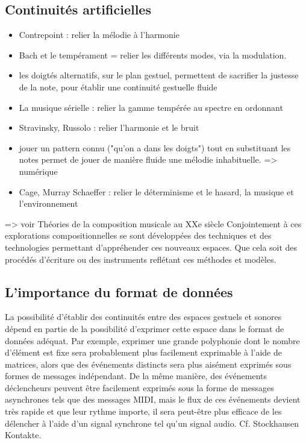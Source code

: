 \subsection{Continuités artificielles}

\vspace{-1em}
\begin{itemize}[noitemsep]
\item Contrepoint : relier la mélodie à l'harmonie 
\item Bach et le tempérament = relier les différents modes, via la modulation.
\item les doigtés alternatifs, sur le plan gestuel, permettent de sacrifier la justesse de la note, pour établir une continuité gestuelle fluide
\item La musique sérielle : relier la gamme tempérée au spectre en ordonnant 
\item Stravinsky, Russolo : relier l’harmonie et le bruit 
\item jouer un pattern connu ("qu'on a dans les doigts") tout en substituant les notes permet de jouer de manière fluide une mélodie inhabituelle. => numérique
\item Cage, Murray Schaeffer : relier le déterminisme et le hasard, la musique et l’environnement 
\end{itemize}

=> voir Théories de la composition musicale au XXe siècle 
Conjointement à ces explorations compositionnelles se sont développées des techniques et des technologies permettant d’appréhender ces nouveaux espaces. Que cela soit des procédés d’écriture ou des instruments reflétant ces méthodes et modèles.

\subsection{L'importance du format de données}
La possibilité d'établir des continuités entre des espaces gestuels et sonores dépend en partie de la possibilité d'exprimer cette espace dans le format de données adéquat. Par exemple, exprimer une grande polyphonie dont le nombre d'élément est fixe sera probablement plus facilement exprimable à l'aide de matrices, alors que des événements distincts sera plus aisément exprimés sous formes de messages indépendant. De la même manière, des événements déclencheurs peuvent être facilement exprimés sous la forme de messages asynchrones tels que des messages MIDI, mais le flux de ces événements devient très rapide et que leur rythme importe, il sera peut-être plus efficace de les délencher à l'aide d'un signal synchrone tel qu'un signal audio. Cf. Stockhausen Kontakte.


